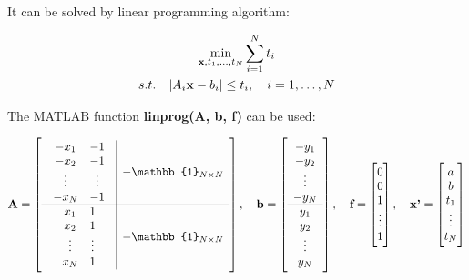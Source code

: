 \documentclass[paper=a4, fontsize=11pt]{scrartcl} %
\numberwithin{equation}{section} %
\numberwithin{figure}{section} %
\numberwithin{table}{section} %
\newcommand{\funcname}[1]{\textbf{#1}}
\renewcommand{\vec}[1]{\mathbf{#1}}
\begin{document}
It can be solved by linear programming algorithm:

\begin{gather*}
\min_{\vec{x}, t_{1}, \dots, t_{N}} \sum_{i=1}^{N} t_{i} \\
 s.t. \quad \abs{A_{i}\vec{x} - b_{i}} \leq t_{i}, \quad i = 1, \dots, N
\end{gather*}

The MATLAB function \funcname{linprog(A, b, f)} can be used:

\begin{gather*}
\textbf{A} = \left[
\begin{array}{c|c}
    \begin{array}{c c}
        -x_{1}	&	-1\\
        -x_{2}	&	-1\\
        \vdots	& \vdots \\
        -x_{N}	&	-1
    \end{array}
    &
    - \mathbb{1}_{N \times N} \\
    \hline
    \begin{array}{c c}
        x_{1}	&	1\\
        x_{2}	&	1\\
        \vdots	& \vdots \\
        x_{N}	&	1
    \end{array}
    &
    - \mathbb{1}_{N \times N} 
\end{array} \right],
\quad \textbf{b} = \left[
\begin{array}{c}
    -y_{1}	\\
    -y_{2}	\\
    \vdots	\\
    -y_{N}	\\
    \hline	
    y_{1}	\\
    y_{2}	\\
    \vdots	\\
    y_{N}
\end{array} \right], 
\quad \textbf{f} = 
    \begin{bmatrix}
    0\\
    0\\
    1\\
    \vdots	\\
    1
    \end{bmatrix}, 
\quad \textbf{x'} = 
    \begin{bmatrix}
    a\\
    b\\
    t_{1}\\
    \vdots	\\
    t_{N}
    \end{bmatrix}
\end{gather*}
\end{document}

